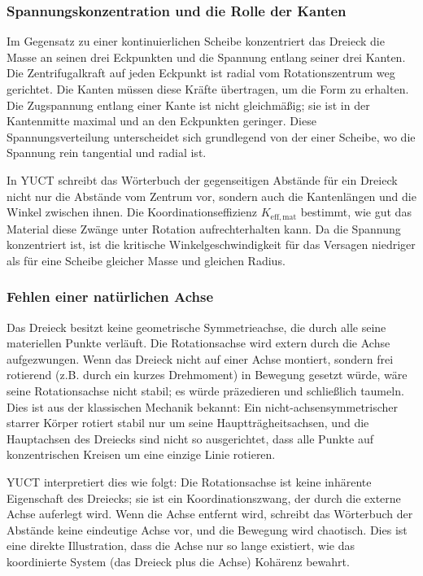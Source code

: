 \documentclass[12pt,a4paper]{article}
\begin{document}
	\subsubsection{Spannungskonzentration und die Rolle der Kanten}
	
	Im Gegensatz zu einer kontinuierlichen Scheibe konzentriert das Dreieck die Masse an seinen drei Eckpunkten und die Spannung entlang seiner drei Kanten. Die Zentrifugalkraft auf jeden Eckpunkt ist radial vom Rotationszentrum weg gerichtet. Die Kanten müssen diese Kräfte übertragen, um die Form zu erhalten. Die Zugspannung entlang einer Kante ist nicht gleichmäßig; sie ist in der Kantenmitte maximal und an den Eckpunkten geringer. Diese Spannungsverteilung unterscheidet sich grundlegend von der einer Scheibe, wo die Spannung rein tangential und radial ist.
	
	In YUCT schreibt das Wörterbuch der gegenseitigen Abstände für ein Dreieck nicht nur die Abstände vom Zentrum vor, sondern auch die Kantenlängen und die Winkel zwischen ihnen. Die Koordinationseffizienz \(K_{\mathrm{eff,mat}}\) bestimmt, wie gut das Material diese Zwänge unter Rotation aufrechterhalten kann. Da die Spannung konzentriert ist, ist die kritische Winkelgeschwindigkeit für das Versagen niedriger als für eine Scheibe gleicher Masse und gleichen Radius.
	
	\subsubsection{Fehlen einer natürlichen Achse}
	
	Das Dreieck besitzt keine geometrische Symmetrieachse, die durch alle seine materiellen Punkte verläuft. Die Rotationsachse wird extern durch die Achse aufgezwungen. Wenn das Dreieck nicht auf einer Achse montiert, sondern frei rotierend (z.B. durch ein kurzes Drehmoment) in Bewegung gesetzt würde, wäre seine Rotationsachse nicht stabil; es würde präzedieren und schließlich taumeln. Dies ist aus der klassischen Mechanik bekannt: Ein nicht-achsensymmetrischer starrer Körper rotiert stabil nur um seine Hauptträgheitsachsen, und die Hauptachsen des Dreiecks sind nicht so ausgerichtet, dass alle Punkte auf konzentrischen Kreisen um eine einzige Linie rotieren.
	
	YUCT interpretiert dies wie folgt: Die Rotationsachse ist keine inhärente Eigenschaft des Dreiecks; sie ist ein Koordinationszwang, der durch die externe Achse auferlegt wird. Wenn die Achse entfernt wird, schreibt das Wörterbuch der Abstände keine eindeutige Achse vor, und die Bewegung wird chaotisch. Dies ist eine direkte Illustration, dass die Achse nur so lange existiert, wie das koordinierte System (das Dreieck plus die Achse) Kohärenz bewahrt.
	
\end{document}

